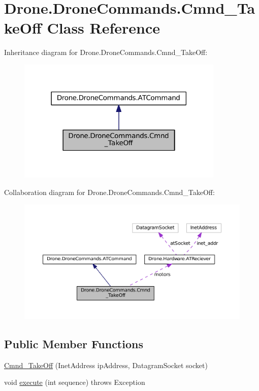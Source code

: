 \hypertarget{class_drone_1_1_drone_commands_1_1_cmnd___take_off}{}\section{Drone.\+Drone\+Commands.\+Cmnd\+\_\+\+Take\+Off Class Reference}
\label{class_drone_1_1_drone_commands_1_1_cmnd___take_off}


Inheritance diagram for Drone.\+Drone\+Commands.\+Cmnd\+\_\+\+Take\+Off\+:\nopagebreak
\begin{figure}[H]
\begin{center}
\leavevmode
\includegraphics[width=279pt]{class_drone_1_1_drone_commands_1_1_cmnd___take_off__inherit__graph}
\end{center}
\end{figure}


Collaboration diagram for Drone.\+Drone\+Commands.\+Cmnd\+\_\+\+Take\+Off\+:\nopagebreak
\begin{figure}[H]
\begin{center}
\leavevmode
\includegraphics[width=350pt]{class_drone_1_1_drone_commands_1_1_cmnd___take_off__coll__graph}
\end{center}
\end{figure}
\subsection*{Public Member Functions}
\begin{DoxyCompactItemize}
\item 
\hyperlink{class_drone_1_1_drone_commands_1_1_cmnd___take_off_adc7675196bf02d255a5d0d099f359a54}{Cmnd\+\_\+\+Take\+Off} (Inet\+Address ip\+Address, Datagram\+Socket socket)
\item 
void \hyperlink{class_drone_1_1_drone_commands_1_1_cmnd___take_off_a53cd5804d2553dd77d31b1934ea546ac}{execute} (int sequence)  throws Exception  	
\end{DoxyCompactItemize}
